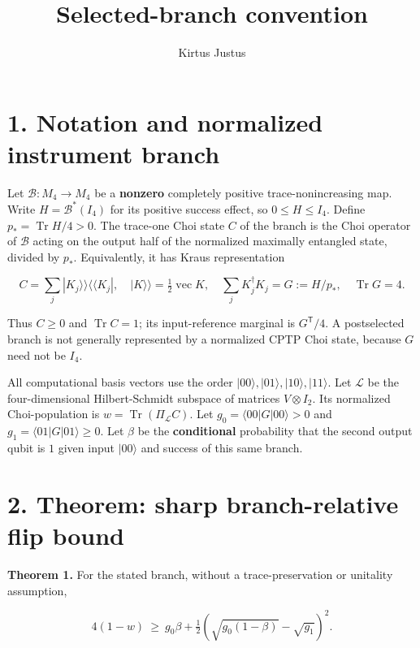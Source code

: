 \documentclass[
  10pt,
  a4paper,
]{article}
\title{Selected-branch convention}
\author{Kirtus Justus}
\date{}
\begin{document}
\maketitle

\section{1. Notation and normalized instrument branch}\label{notation-and-normalized-instrument-branch}

Let \(\mathcal B: M_4\to M_4\) be a \textbf{nonzero} completely positive trace-nonincreasing map. Write \(H=\mathcal B^*(I_4)\) for its positive success effect, so \(0\le H\le I_4\). Define \(p_*=\operatorname{Tr}H/4>0\). The trace-one Choi state \(C\) of the branch is the Choi operator of \(\mathcal B\) acting on the output half of the normalized maximally entangled state, divided by \(p_*\). Equivalently, it has Kraus representation

\[
C=\sum_j |K_j\rangle\!\rangle\langle\!\langle K_j|,
\quad |K\rangle\!\rangle=\tfrac12\operatorname{vec}K,\quad
\sum_jK_j^\dagger K_j=G:=H/p_*,\quad \operatorname{Tr}G=4.
\]

Thus \(C\ge0\) and \(\operatorname{Tr}C=1\); its input-reference marginal is \(G^{\mathsf T}/4\). A postselected branch is not generally represented by a normalized CPTP Choi state, because \(G\) need not be \(I_4\).

All computational basis vectors use the order \(|00\rangle,|01\rangle,|10\rangle,|11\rangle\). Let \(\mathcal L\) be the four-dimensional Hilbert-Schmidt subspace of matrices \(V\otimes I_2\). Its normalized Choi-population is \(w=\operatorname{Tr}(\Pi_{\mathcal L} C)\). Let \(g_0=\langle00|G|00\rangle>0\) and \(g_1=\langle01|G|01\rangle\ge0\). Let \(\beta\) be the \textbf{conditional} probability that the second output qubit is \(1\) given input \(|00\rangle\) and success of this same branch.

\section{2. Theorem: sharp branch-relative flip bound}\label{theorem-sharp-branch-relative-flip-bound}

\textbf{Theorem 1.} For the stated branch, without a trace-preservation or unitality assumption,

\[
\boxed{\quad 4(1-w)\ \ge\ g_0\beta+
\tfrac12\left(\sqrt{g_0(1-\beta)}-\sqrt{g_1}\right)^2.\quad}
\tag{1}
\]
\end{document}

